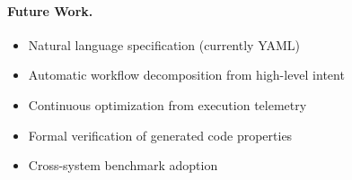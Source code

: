 \documentclass[11pt]{article}
\begin{document}
\paragraph{Future Work.}
\begin{itemize}
    \item Natural language specification (currently YAML)
    \item Automatic workflow decomposition from high-level intent
    \item Continuous optimization from execution telemetry
    \item Formal verification of generated code properties
    \item Cross-system benchmark adoption
\end{itemize}



\end{document}
